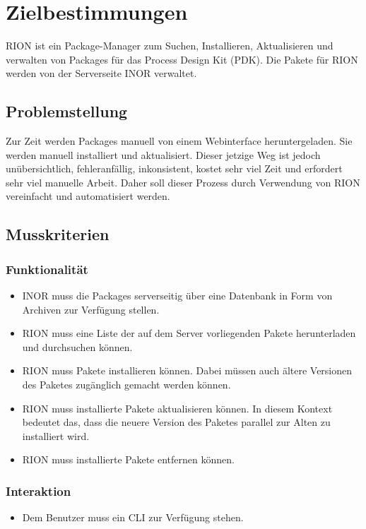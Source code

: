 \chapter{Zielbestimmungen}

RION ist ein Package-Manager zum Suchen, Installieren, Aktualisieren und verwalten von Packages für das Process Design Kit (PDK). Die Pakete für RION werden von der Serverseite INOR verwaltet.

\section{Problemstellung}
Zur Zeit werden Packages manuell von einem Webinterface heruntergeladen. Sie werden manuell installiert und aktualisiert. Dieser jetzige Weg ist jedoch unübersichtlich, fehleranfällig, inkonsistent, kostet sehr viel Zeit und erfordert sehr viel manuelle Arbeit. Daher soll dieser Prozess durch Verwendung von RION vereinfacht und automatisiert werden.

\section{Musskriterien}
\subsection{Funktionalität}
\begin{itemize}
		\item INOR muss die Packages serverseitig über eine Datenbank in Form von Archiven zur Verfügung stellen.
		\item RION muss eine Liste der auf dem Server vorliegenden Pakete herunterladen und durchsuchen können.
		\item RION muss Pakete installieren können. Dabei müssen auch ältere Versionen des Paketes zugänglich gemacht werden können.
		\item RION muss installierte Pakete aktualisieren können. In diesem Kontext bedeutet das, dass die neuere Version des Paketes parallel zur Alten zu installiert wird.
		\item RION muss installierte Pakete entfernen können.
\end{itemize}

\subsection{Interaktion}


\begin{itemize}
	\item Dem Benutzer muss ein CLI zur Verfügung stehen.
\end{itemize}

